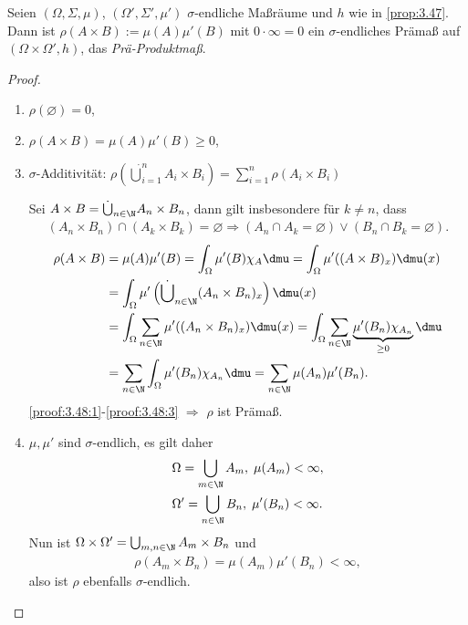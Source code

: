 \begin{prop}
\label{prop:3.48}
Seien $(\Omega,\Sigma,\mu)$, $(\Omega',\Sigma',\mu')$ $\sigma$-endliche
Maßräume und $h$ wie in \ref{prop:3.47}. Dann ist $\rho(A\times B) :=
\mu(A)\mu'(B)$ mit $0\cdot\infty = 0$ ein $\sigma$-endliches Prämaß auf
$(\Omega\times\Omega',h)$, das \emph{Prä-Produktmaß}.\fishhere
\end{prop}
\begin{proof}
\begin{enumerate}[label=(\roman{*})]
  \item\label{proof:3.48:1} $\rho(\varnothing) = 0$,
  \item\label{proof:3.48:2} $\rho(A\times B) = \mu(A)\mu'(B) \ge 0$,
  \item\label{proof:3.48:3} $\sigma$-Additivität: $\rho(\dot{\bigcup}_{i=1}^n
  A_i\times B_i) = \sum\limits_{i=1}^n \rho(A_i\times B_i)$
  
  Sei $A\times B = \dot{\bigcup}_{n\in\N} A_n\times B_n$, dann gilt
  insbesondere für $k\neq n$, dass
\begin{align*}
(A_n\times B_n)\cap (A_k\times B_k) = \varnothing \Rightarrow (A_n\cap A_k =
\varnothing)\lor (B_n\cap B_k = \varnothing).
\end{align*}
\begin{align*}
\rho(A\times B) &= \mu(A)\mu'(B) = \int_\Omega \mu'(B)\chi_A \dmu
= \int_\Omega \mu'((A\times B)_x)\dmu(x)
\\ &= \int_\Omega \mu'\left(\dot{\bigcup}_{n\in\N}(A_n\times
B_n)_x\right)\dmu(x) \\ &= \int_\Omega \sum\limits_{n\in\N} \mu'((A_n\times B_n)_x)\dmu(x)
= \int_\Omega \sum\limits_{n\in\N} \underbrace{\mu'(B_n)\chi_{A_n}}_{\ge
0}\dmu
\\ &= \sum\limits_{n\in\N} \int_\Omega \mu'(B_n)\chi_{A_n} \dmu
= \sum\limits_{n\in\N} \mu(A_n)\mu'(B_n).
\end{align*}
\ref{proof:3.48:1}-\ref{proof:3.48:3} $\Rightarrow$ $\rho$ ist Prämaß.
\item $\mu,\mu'$ sind $\sigma$-endlich, es gilt daher
\begin{align*}
&\Omega = \bigcup_{m\in\N} A_m,\;\mu(A_m)<\infty,\\
&\Omega' = \bigcup_{n\in\N} B_n,\;\mu'(B_n)<\infty.
\end{align*}
Nun ist $\Omega\times\Omega' = \bigcup_{m,n\in\N} A_m\times B_n$ und
\begin{align*}
\rho(A_m\times B_n) = \mu(A_m)\mu'(B_n) < \infty,
\end{align*}
also ist $\rho$ ebenfalls $\sigma$-endlich.\qedhere
\end{enumerate}
\end{proof}

